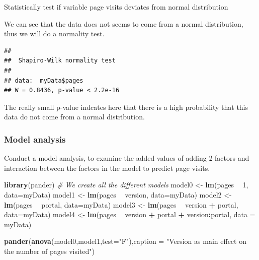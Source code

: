 \documentclass[]{article}
\newenvironment{Shaded}{\begin{snugshade}}{\end{snugshade}}
\newcommand{\KeywordTok}[1]{\textcolor[rgb]{0.13,0.29,0.53}{\textbf{#1}}}
\newcommand{\DataTypeTok}[1]{\textcolor[rgb]{0.13,0.29,0.53}{#1}}
\newcommand{\DecValTok}[1]{\textcolor[rgb]{0.00,0.00,0.81}{#1}}
\newcommand{\StringTok}[1]{\textcolor[rgb]{0.31,0.60,0.02}{#1}}
\newcommand{\CommentTok}[1]{\textcolor[rgb]{0.56,0.35,0.01}{\textit{#1}}}
\newcommand{\OperatorTok}[1]{\textcolor[rgb]{0.81,0.36,0.00}{\textbf{#1}}}
\newcommand{\NormalTok}[1]{#1}
\begin{document}
Statistically test if variable page visits deviates from normal
distribution

We can see that the data does not seems to come from a normal
distribution, thus we will do a normality test.

\begin{Shaded}
\end{Shaded}

\begin{verbatim}
## 
##  Shapiro-Wilk normality test
## 
## data:  myData$pages
## W = 0.8436, p-value < 2.2e-16
\end{verbatim}

The really small p-value indcates here that there is a high probability
that this data do not come from a normal distribution.

\subsubsection{Model analysis}\label{model-analysis}

Conduct a model analysis, to examine the added values of adding 2
factors and interaction between the factors in the model to predict page
visits.

\begin{Shaded}
\begin{Highlighting}[]
\KeywordTok{library}\NormalTok{(pander)}
\CommentTok{# We create all the different models}
\NormalTok{model0 <-}\StringTok{ }\KeywordTok{lm}\NormalTok{(pages }\OperatorTok{~}\StringTok{ }\DecValTok{1}\NormalTok{, }\DataTypeTok{data=}\NormalTok{myData)}
\NormalTok{model1 <-}\StringTok{ }\KeywordTok{lm}\NormalTok{(pages }\OperatorTok{~}\StringTok{ }\NormalTok{version, }\DataTypeTok{data=}\NormalTok{myData)}
\NormalTok{model2 <-}\StringTok{ }\KeywordTok{lm}\NormalTok{(pages }\OperatorTok{~}\StringTok{ }\NormalTok{portal, }\DataTypeTok{data=}\NormalTok{myData)}
\NormalTok{model3 <-}\StringTok{ }\KeywordTok{lm}\NormalTok{(pages }\OperatorTok{~}\StringTok{ }\NormalTok{version }\OperatorTok{+}\StringTok{ }\NormalTok{portal, }\DataTypeTok{data=}\NormalTok{myData)}
\NormalTok{model4 <-}\StringTok{ }\KeywordTok{lm}\NormalTok{(pages }\OperatorTok{~}\StringTok{ }\NormalTok{version }\OperatorTok{+}\StringTok{ }\NormalTok{portal }\OperatorTok{+}\StringTok{ }\NormalTok{version}\OperatorTok{:}\NormalTok{portal, }\DataTypeTok{data =}\NormalTok{ myData)}


\KeywordTok{pander}\NormalTok{(}\KeywordTok{anova}\NormalTok{(model0,model1,}\DataTypeTok{test=}\StringTok{"F"}\NormalTok{),}\DataTypeTok{caption =} \StringTok{"Version as main effect on the number of pages visited"}\NormalTok{)}
\end{Highlighting}
\end{Shaded}
\end{document}
